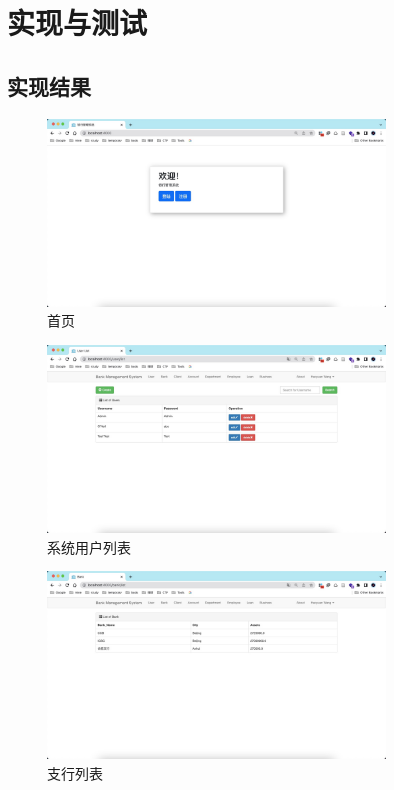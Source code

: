 \documentclass{article}
\begin{document}
    \section{实现与测试}
    \subsection{实现结果}
    \begin{figure}[H]
        \centering
        \includegraphics[width=0.8\textwidth]{./fig/index.jpg}
        \caption[index]{首页}
    \end{figure}
    \begin{figure}[H]
        \centering
        \includegraphics[width=0.8\textwidth]{./fig/user_list.jpg}
        \caption[user_list]{系统用户列表}
    \end{figure}
    \begin{figure}[H]
        \centering
        \includegraphics[width=0.8\textwidth]{./fig/bank_list.jpg}
        \caption[bank_list]{支行列表}
    \end{figure}
\end{document}

